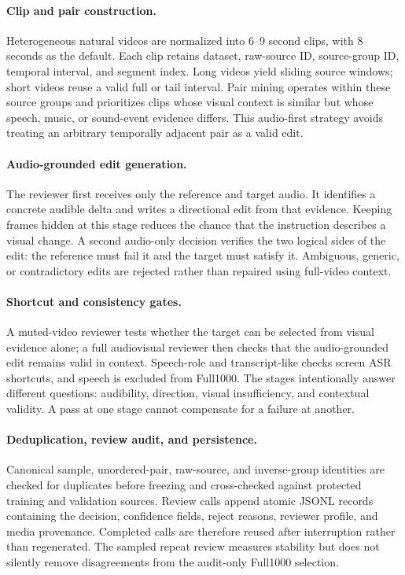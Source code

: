 \documentclass[letterpaper]{article}
\begin{document}
\paragraph{Clip and pair construction.}
Heterogeneous natural videos are normalized into 6--9 second clips, with 8 seconds as the default.
Each clip retains dataset, raw-source ID, source-group ID, temporal interval, and segment index.
Long videos yield sliding source windows; short videos reuse a valid full or tail interval.
Pair mining operates within these source groups and prioritizes clips whose visual context is similar but whose speech, music, or sound-event evidence differs.
This audio-first strategy avoids treating an arbitrary temporally adjacent pair as a valid edit.

\paragraph{Audio-grounded edit generation.}
The reviewer first receives only the reference and target audio.
It identifies a concrete audible delta and writes a directional edit from that evidence.
Keeping frames hidden at this stage reduces the chance that the instruction describes a visual change.
A second audio-only decision verifies the two logical sides of the edit: the reference must fail it and the target must satisfy it.
Ambiguous, generic, or contradictory edits are rejected rather than repaired using full-video context.

\paragraph{Shortcut and consistency gates.}
A muted-video reviewer tests whether the target can be selected from visual evidence alone; a full audiovisual reviewer then checks that the audio-grounded edit remains valid in context.
Speech-role and transcript-like checks screen ASR shortcuts, and speech is excluded from Full1000.
The stages intentionally answer different questions: audibility, direction, visual insufficiency, and contextual validity.
A pass at one stage cannot compensate for a failure at another.

\paragraph{Deduplication, review audit, and persistence.}
Canonical sample, unordered-pair, raw-source, and inverse-group identities are checked for duplicates before freezing and cross-checked against protected training and validation sources.
Review calls append atomic JSONL records containing the decision, confidence fields, reject reasons, reviewer profile, and media provenance.
Completed calls are therefore reused after interruption rather than regenerated.
The sampled repeat review measures stability but does not silently remove disagreements from the audit-only Full1000 selection.
\end{document}
